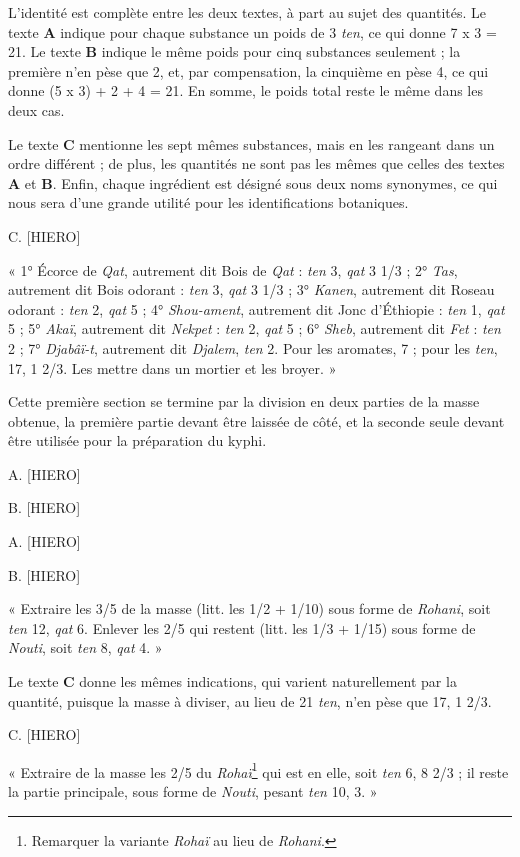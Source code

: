 \documentclass[a4paper, 11pt, oneside]{article}
\begin{document}
L'identité est complète entre les deux textes, à part au sujet des quantités. Le texte \textbf{A} indique pour chaque substance un poids de 3 \emph{ten}, ce qui donne 7 x 3 = 21. Le texte \textbf{B} indique le même poids pour cinq substances seulement ; la première n'en pèse que 2, et, par compensation, la cinquième en pèse 4, ce qui donne (5 x 3) + 2 + 4 = 21. En somme, le poids total reste le même dans les deux cas.

Le texte \textbf{C} mentionne les sept mêmes substances, mais en les rangeant dans un ordre différent ; de plus, les quantités ne sont pas les mêmes que celles des textes \textbf{A} et \textbf{B}. Enfin, chaque ingrédient est désigné sous deux noms synonymes, ce qui nous sera d'une grande utilité pour les identifications botaniques.

C. [HIERO]

« 1° Écorce de \emph{Qat}, autrement dit Bois de \emph{Qat} : \emph{ten} 3, \emph{qat} 3 1/3 ; 2° \emph{Tas}, autrement dit Bois odorant : \emph{ten} 3, \emph{qat} 3 1/3 ; 3° \emph{Kanen}, autrement dit Roseau odorant : \emph{ten} 2, \emph{qat} 5 ; 4° \emph{Shou-ament}, autrement dit Jonc d'Éthiopie : \emph{ten} 1, \emph{qat} 5 ; 5° \emph{Akaï}, autrement dit \emph{Nekpet} : \emph{ten} 2, \emph{qat} 5 ; 6° \emph{Sheb}, autrement dit \emph{Fet} : \emph{ten} 2 ; 7° \emph{Djabâï-t}, autrement dit \emph{Djalem}, \emph{ten} 2. Pour les aromates, 7 ; pour les \emph{ten}, 17, 1 2/3. Les mettre dans un mortier et les broyer. »

Cette première section se termine par la division en deux parties de la masse obtenue, la première partie devant être laissée de côté, et la seconde seule devant être utilisée pour la préparation du kyphi.

A. [HIERO]

B. [HIERO]

A. [HIERO]

B. [HIERO]

« Extraire les 3/5 de la masse (litt. les 1/2 + 1/10) sous forme de \emph{Rohani}, soit \emph{ten} 12, \emph{qat} 6. Enlever les 2/5 qui restent (litt. les 1/3 + 1/15) sous forme de \emph{Nouti}, soit \emph{ten} 8, \emph{qat} 4. »

Le texte \textbf{C} donne les mêmes indications, qui varient naturellement par la quantité, puisque la masse à diviser, au lieu de 21 \emph{ten}, n'en pèse que 17, 1 2/3.

C. [HIERO]

« Extraire de la masse les 2/5 du \emph{Rohaï}\footnote{Remarquer la variante \emph{Rohaï} au lieu de \emph{Rohani}.} qui est en elle, soit \emph{ten} 6, 8 2/3 ; il reste la partie principale, sous forme de \emph{Nouti}, pesant \emph{ten} 10, 3. »
\end{document}
